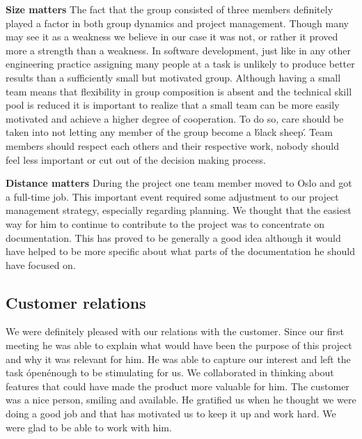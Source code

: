 \textbf{Size matters}\newline
The fact that the group consisted of three members definitely played a factor in both group dynamics
and project management. Though many may see it as a weakness we believe in our case it was not,
or rather it proved more a strength than a weakness.
In software development, just like in any other engineering practice assigning many people
at a task is unlikely to produce better results than a sufficiently small but motivated group.
Although having a small team means that flexibility in group composition is absent and
the technical skill pool is reduced it is important to realize that a small team
can be more easily motivated and achieve a higher degree of cooperation.
To do so, care should be taken into not letting any member of the group become
a \'black sheep\'. Team members should respect each others and their respective work,
nobody should feel less important or cut out of the decision making process.

\textbf{Distance matters}\newline
During the project one team member moved to Oslo and got a full-time job.
This important event required some adjustment to our project management strategy,
especially regarding planning. We thought that the easiest way for him to continue
to contribute to the project was to concentrate on documentation.
This has proved to be generally a good idea although it would have helped
to be more specific about what parts of the documentation he should have focused on.


\subsection{Customer relations}

We were definitely pleased with our relations with the customer.
Since our first meeting he was able to explain what would have been the purpose of this project and why
it was relevant for him. He was able to capture our interest and left the task \'open\' enough to be stimulating for us.
We collaborated in thinking about features that could have made the product more valuable for him.
The customer was a nice person, smiling and available. He gratified us when he thought we were doing a good job and
that has motivated us to keep it up and work hard. We were glad to be able to work with him.

